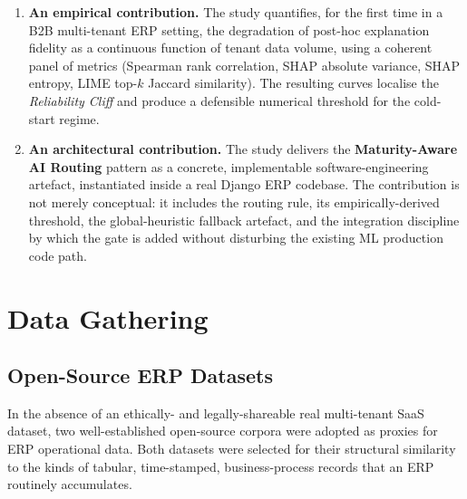 \begin{enumerate}
    \item \textbf{An empirical contribution.} The study quantifies, for the
    first time in a B2B multi-tenant ERP setting, the degradation of post-hoc
    explanation fidelity as a continuous function of tenant data volume,
    using a coherent panel of metrics (Spearman rank correlation, SHAP
    absolute variance, SHAP entropy, LIME top-$k$ Jaccard similarity). The
    resulting curves localise the \emph{Reliability Cliff} and produce a
    defensible numerical threshold for the cold-start regime.
    \item \textbf{An architectural contribution.} The study delivers the
    \textbf{Maturity-Aware AI Routing} pattern as a concrete, implementable
    software-engineering artefact, instantiated inside a real Django ERP
    codebase. The contribution is not merely conceptual: it includes the
    routing rule, its empirically-derived threshold, the global-heuristic
    fallback artefact, and the integration discipline by which the gate is
    added without disturbing the existing ML production code path.
\end{enumerate}

\section{Data Gathering}
\label{sec:data-gathering}

\subsection{Open-Source ERP Datasets}
\label{subsec:datasets}

In the absence of an ethically- and legally-shareable real multi-tenant SaaS
dataset, two well-established open-source corpora were adopted as proxies for
ERP operational data. Both datasets were selected for their structural
similarity to the kinds of tabular, time-stamped, business-process records
that an ERP routinely accumulates.

